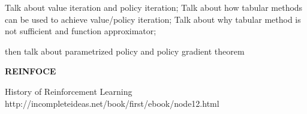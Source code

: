 \documentclass{article}
\begin{document}
Talk about value iteration and policy iteration;
Talk about how tabular methods can be used to achieve
value/policy iteration;
Talk about why tabular method is not sufficient and function 
approximator;

then talk about parametrized policy and policy gradient theorem 

\textbf{REINFOCE}


History of Reinforcement Learning
http://incompleteideas.net/book/first/ebook/node12.html
\end{document}
